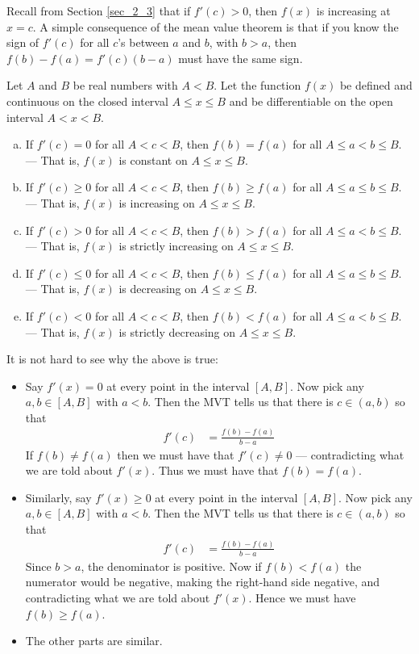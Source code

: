 Recall from Section \ref{sec_2_3} that if $f'(c)>0$, then $f(x)$ is 
increasing at $x=c$.
A simple consequence of the mean value theorem is that if you know the
sign of $f'(c)$ for all $c$'s between $a$ and $b$, with $b>a$, then
$f(b)-f(a) = f'(c) (b-a)$ must have the same sign.
\begin{cor}
\label{cor:DIFFmvtcons}
Let $A$ and $B$ be real numbers with $A<B$.
Let the function $f(x)$ be defined and continuous on
the closed interval $A\le x\le B$ and be differentiable on the
open interval $A<x<B$.
\begin{enumerate}[(a)]
\item If $f'(c)=0$ for all $A<c<B$, then $f(b)=f(a)$ for all
$A\le a<b\le B$.\\
--- That is, $f(x)$ is constant on $A\le x\le B$.
\item If $f'(c)\ge 0$ for all $A<c<B$, then $f(b)\ge f(a)$ for all
$A\le a\le b\le B$.\\
--- That is, $f(x)$ is increasing on $A\le x\le B$.
\item If $f'(c)> 0$ for all $A<c<B$, then $f(b) > f(a)$ for all
$A\le a < b\le B$.\\
--- That is, $f(x)$ is strictly increasing on $A\le x\le B$.
\item If $f'(c)\le 0$ for all $A<c<B$, then $f(b)\le f(a)$ for all
$A\le a \le b\le B$.\\
--- That is, $f(x)$ is decreasing on $A\le x\le B$.
\item If $f'(c)< 0$ for all $A<c<B$, then $f(b) < f(a)$ for all
$A\le a < b\le B$.\\
--- That is, $f(x)$ is strictly decreasing on $A\le x\le B$.
\end{enumerate}

\end{cor}
It is not hard to see why the above is true:
\begin{itemize}
 \item Say $f'(x)=0$ at every point in the interval $[A,B]$. Now pick any $a,b \in [A,B]$
with $a<b$. Then the MVT tells us that there is $c \in (a,b)$ so that
\begin{align*}
  f'(c) &= \frac{f(b)-f(a)}{b-a}
\end{align*}
If $f(b) \neq f(a)$ then we must have that $f'(c) \neq 0$ --- contradicting what we are
told about $f'(x)$. Thus we must have that $f(b)=f(a)$.

\item Similarly, say $f'(x) \geq 0$ at every point in the interval $[A,B]$. Now pick any
$a,b \in [A,B]$  with $a<b$. Then the MVT tells us that there is $c \in (a,b)$ so that
\begin{align*}
  f'(c) &= \frac{f(b)-f(a)}{b-a}
\end{align*}
Since $b>a$, the denominator is positive. Now if $f(b) < f(a)$ the numerator would be
negative, making the right-hand side negative, and contradicting what we are told about
$f'(x)$. Hence we must have $f(b)\ge f(a)$.

\item The other parts are similar.
\end{itemize}

